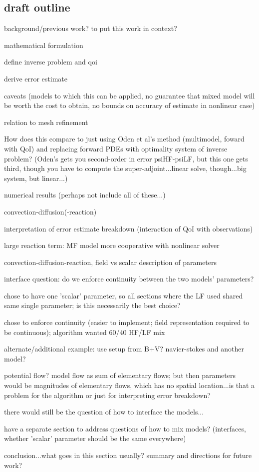 \subsection{draft outline}
\bit 
\item background/previous work? to put this work in context?
\item mathematical formulation
  \bit
  \item define inverse problem and qoi
  \item derive error estimate
  \item caveats (models to which this can be applied, no guarantee that mixed model will be worth the cost to obtain, no bounds on accuracy of estimate in nonlinear case)
  \item relation to mesh refinement
  \item How does this compare to just using Oden et al's method (multimodel, foward with QoI) and replacing forward PDEs with optimality system of inverse problem? (Oden's gets you second-order in error psiHF-psiLF, but this one gets third, though you have to compute the super-adjoint...linear solve, though...big system, but linear...)
  \eit
\item numerical results (perhaps not include all of these...)
  \bit
  \item convection-diffusion(-reaction)
    \bit
    \item interpretation of error estimate breakdown (interaction of QoI with observations)
    \item large reaction term: MF model more cooperative with nonlinear solver
    \eit
  \item convection-diffusion-reaction, field vs scalar description of parameters
    \bit
    \item interface question: do we enforce continuity between the two models' parameters?
    \item chose to have one 'scalar' parameter, so all sections where the LF used shared same single parameter; is this necessarily the best choice?
    \item chose to enforce continuity (easier to implement; field representation required to be continuous); algorithm wanted 60/40 HF/LF mix
    \eit
  \item alternate/additional example: use setup from B+V? navier-stokes and another model? 
    \bit
    \item potential flow? model flow as sum of elementary flows; but then parameters would be magnitudes of elementary flows, which has no spatial location...is that a problem for the algorithm or just for interpreting error breakdown?
    \item there would still be the question of how to interface the models...
    \eit
  \item have a separate section to address questions of how to mix models? (interfaces, whether 'scalar' parameter should be the same everywhere)
  \eit
\item conclusion...what goes in this section usually? summary and directions for future work?
\eit

